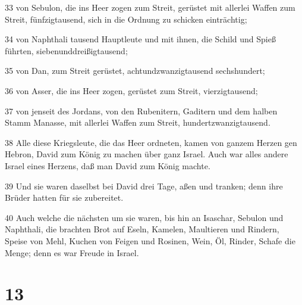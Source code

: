 \par 33 von Sebulon, die ins Heer zogen zum Streit, gerüstet mit allerlei Waffen zum Streit, fünfzigtausend, sich in die Ordnung zu schicken einträchtig;
\par 34 von Naphthali tausend Hauptleute und mit ihnen, die Schild und Spieß führten, siebenunddreißigtausend;
\par 35 von Dan, zum Streit gerüstet, achtundzwanzigtausend sechshundert;
\par 36 von Asser, die ins Heer zogen, gerüstet zum Streit, vierzigtausend;
\par 37 von jenseit des Jordans, von den Rubenitern, Gaditern und dem halben Stamm Manasse, mit allerlei Waffen zum Streit, hundertzwanzigtausend.
\par 38 Alle diese Kriegsleute, die das Heer ordneten, kamen von ganzem Herzen gen Hebron, David zum König zu machen über ganz Israel. Auch war alles andere Israel eines Herzens, daß man David zum König machte.
\par 39 Und sie waren daselbst bei David drei Tage, aßen und tranken; denn ihre Brüder hatten für sie zubereitet.
\par 40 Auch welche die nächsten um sie waren, bis hin an Isaschar, Sebulon und Naphthali, die brachten Brot auf Eseln, Kamelen, Maultieren und Rindern, Speise von Mehl, Kuchen von Feigen und Rosinen, Wein, Öl, Rinder, Schafe die Menge; denn es war Freude in Israel.

\chapter{13}

